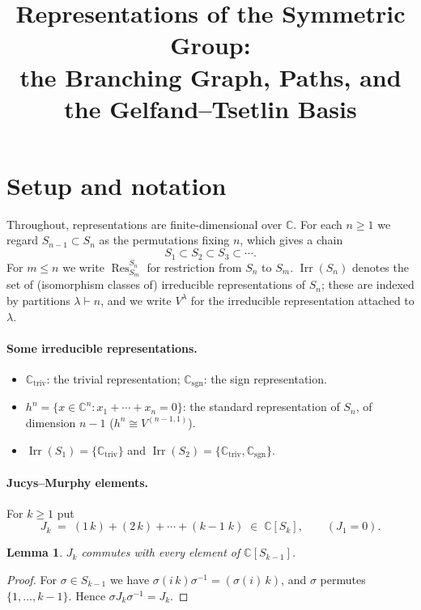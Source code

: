 \documentclass[11pt]{article}
\title{Representations of the Symmetric Group:\\
the Branching Graph, Paths, and the Gelfand--Tsetlin Basis}
\author{}
\date{}
\newtheorem{lemma}[theorem]{Lemma}
\theoremstyle{definition}
\theoremstyle{remark}
\newcommand{\C}{\mathbb{C}}
\DeclareMathOperator{\Irr}{Irr}
\DeclareMathOperator{\Res}{Res}
\newcommand{\Ctriv}{\C_{\mathrm{triv}}}
\newcommand{\Csgn}{\C_{\mathrm{sgn}}}
\newcommand{\h}{h}                 %
\begin{document}
\maketitle

\section{Setup and notation}

Throughout, representations are finite-dimensional over $\C$. For each
$n\ge 1$ we regard $S_{n-1}\subset S_n$ as the permutations fixing $n$, which
gives a chain
\[
  S_1\subset S_2\subset S_3\subset\cdots .
\]
For $m\le n$ we write $\Res^{S_n}_{S_m}$ for restriction from $S_n$ to $S_m$.
$\Irr(S_n)$ denotes the set of (isomorphism classes of) irreducible
representations of $S_n$; these are indexed by partitions $\lambda\vdash n$,
and we write $V^\lambda$ for the irreducible representation attached to
$\lambda$.

\paragraph{Some irreducible representations.}
\begin{itemize}[nosep]
  \item $\Ctriv$: the trivial representation; $\Csgn$: the sign representation.
  \item $\h^n=\{x\in\C^n : x_1+\cdots+x_n=0\}$: the standard representation of
        $S_n$, of dimension $n-1$ ($\h^n\cong V^{(n-1,1)}$).
  \item $\Irr(S_1)=\{\Ctriv\}$ and $\Irr(S_2)=\{\Ctriv,\Csgn\}$.
\end{itemize}

\paragraph{Jucys--Murphy elements.}
For $k\ge 1$ put
\[
  J_k \;=\; (1\,k)+(2\,k)+\cdots+(k-1\;k)\;\in\;\C[S_k],
  \qquad (J_1=0).
\]
\begin{lemma}\label{lem:JM-commute}
$J_k$ commutes with every element of $\C[S_{k-1}]$.
\end{lemma}
\begin{proof}
For $\sigma\in S_{k-1}$ we have $\sigma(i\,k)\sigma^{-1}=(\sigma(i)\,k)$, and
$\sigma$ permutes $\{1,\dots,k-1\}$. Hence $\sigma J_k\sigma^{-1}=J_k$.
\end{proof}
\end{document}
